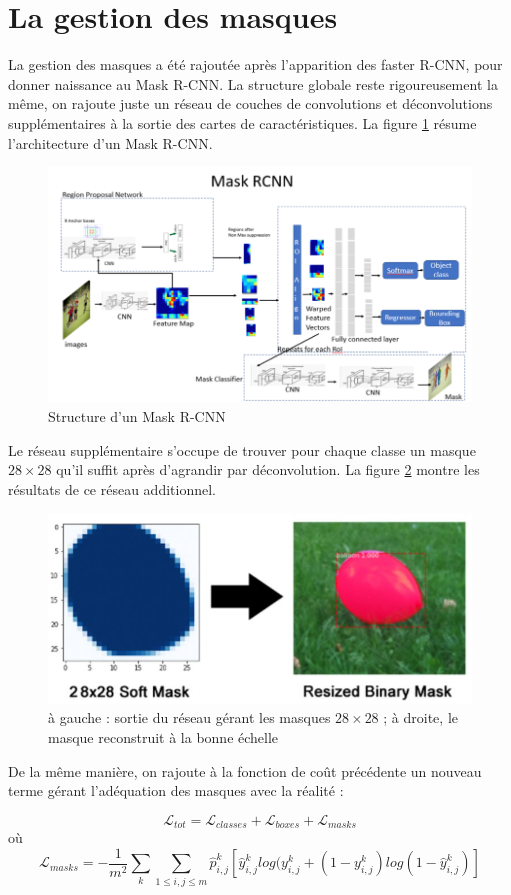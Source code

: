\section{La gestion des masques}

La gestion des masques a été rajoutée après l'apparition des faster R-CNN, pour donner naissance au Mask R-CNN. La structure globale reste rigoureusement la même, on rajoute juste un réseau de couches de convolutions et déconvolutions supplémentaires à la sortie des cartes de caractéristiques. La figure \ref{Structure_Mask_R_CNN} résume l'architecture d'un Mask R-CNN.

\begin{figure}[!h]
\centering
\includegraphics[width=200pts]{images/Mask_R_CNN/structure_Mask_R_CNN.png} 
\caption{Structure d'un Mask R-CNN}
\label{Structure_Mask_R_CNN}
\end{figure}

Le réseau supplémentaire s'occupe de trouver pour chaque classe un masque $28 \times 28$ qu'il suffit après d'agrandir par déconvolution.
La figure \ref{masks} montre les résultats de ce réseau additionnel.

\begin{figure}[!h]
\centering
\includegraphics[width=200pts]{images/Mask_R_CNN/masks.png} 
\caption{à gauche : sortie du réseau gérant les masques $28 \times 28$ ; à droite, le masque reconstruit à la bonne échelle}
\label{masks}
\end{figure}

De la même manière, on rajoute à la fonction de coût précédente un nouveau terme gérant l'adéquation des masques avec la réalité :

$$\mathcal{L}_{tot} = \mathcal{L}_{classes} + \mathcal{L}_{boxes} + \mathcal{L}_{masks}$$ 
où 
$$\mathcal{L}_{masks} = -\frac{1}{m^2} \sum_k \sum_{1 \leq i,j \leq m} \hat{p}^k_{i,j}[ \hat{y}^k_{i,j} log(y^k_{i,j} + (1-y^k_{i,j}) log(1-\hat{y}^k_{i,j})]$$

